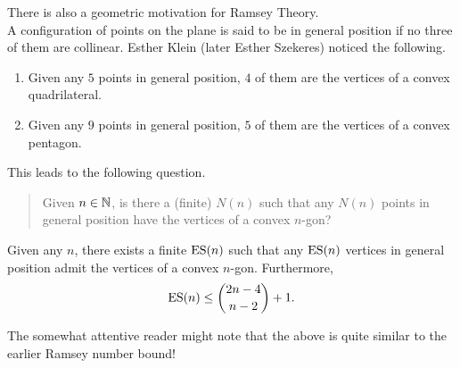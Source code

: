 	 There is also a geometric motivation for Ramsey Theory.\\
	 A configuration of points on the plane is said to be in general position if no three of them are collinear. Esther Klein (later Esther Szekeres) noticed the following.
	 \begin{enumerate}
	 	\item Given any $5$ points in general position, $4$ of them are the vertices of a convex quadrilateral.
	 	\item Given any $9$ points in general position, $5$ of them are the vertices of a convex pentagon.
	 \end{enumerate}
	 This leads to the following question.\\
	 \begin{quote}
	 	Given $n\in\mathbb{N}$, is there a (finite) $N(n)$ such that any $N(n)$ points in general position have the vertices of a convex $n$-gon?
	 \end{quote}

	 \begin{ftheo}
	 	Given any $n$, there exists a finite $\operatorname{ES}(n)$ such that any $\operatorname{ES}(n)$ vertices in general position admit the vertices of a convex $n$-gon. Furthermore,
	 	\[ \operatorname{ES}(n) \le \binom{2n-4}{n-2} + 1. \]
	 \end{ftheo}

	 The somewhat attentive reader might note that the above is quite similar to the earlier Ramsey number bound!
